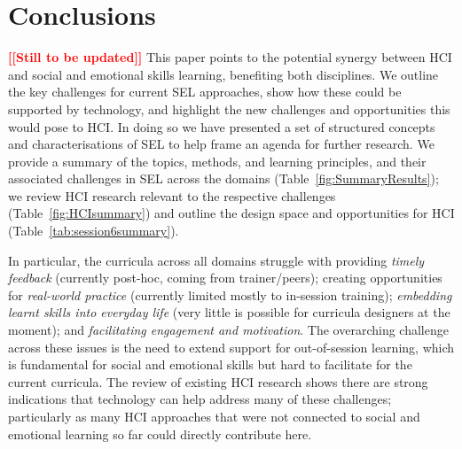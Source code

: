 \documentclass[prodmode,acmtochi]{acmsmall}
\newcommand{\TODO}[1]{\textrm{\textbf{\textcolor{Red}{[[#1]]}}}}
\begin{document}





\section{Conclusions}
\label{sec:conclusion}

\TODO{Still to be updated}
This paper points to the potential synergy between HCI and social and emotional skills learning, benefiting both disciplines.
%
We outline the key challenges for current SEL approaches, show how these could be supported by technology, and highlight the new challenges and opportunities this would pose to HCI.
%
In doing so we have presented a set of structured concepts and characterisations of SEL to help frame an agenda for further research. We provide a summary of the topics, methods, and learning principles, and their associated challenges in SEL across the domains (Table~\ref{fig:SummaryResults}); we review HCI research relevant to the respective challenges (Table~\ref{fig:HCIsummary}) and outline the design space and opportunities for HCI  (Table~\ref{tab:session6summary}).

In particular, the curricula across all domains struggle with providing \emph{timely feedback} (currently post-hoc, coming from trainer/peers); creating opportunities for \emph{real-world practice} (currently limited mostly to in-session training); \emph{embedding learnt skills into everyday life} (very little is possible for curricula designers at the moment); and \emph{facilitating engagement and motivation}. The overarching challenge across these issues is the need to extend support for out-of-session learning, which is fundamental for social and emotional skills  but hard to facilitate for the current curricula.
%
The review of existing HCI research shows there are strong indications that technology can help address many of these challenges; particularly as many HCI approaches that were not connected to social and emotional learning so far could directly contribute here.
\end{document}
